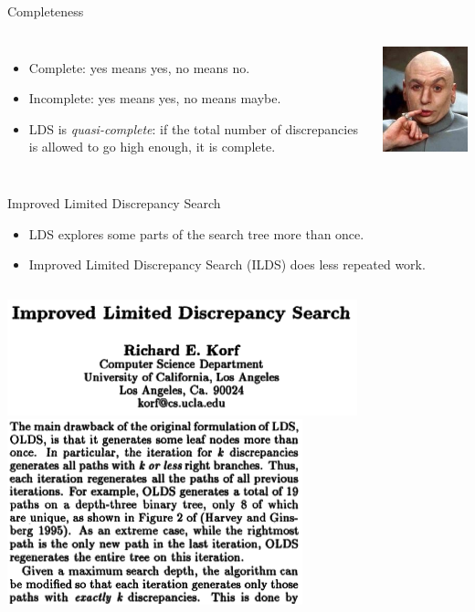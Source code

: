 \documentclass{beamer}
\begin{document}
\begin{frame}{Completeness}
    \begin{columns}
        \begin{itemize}
            \item Complete: yes means yes, no means no.
            \item Incomplete: yes means yes, no means maybe.
            \item LDS is \emph{quasi-complete}: if the total number of discrepancies is allowed to go
                high enough, it is complete.
        \end{itemize}
        \centering\includegraphics*[keepaspectratio=true,scale=0.4]{quasi.jpg}
    \end{columns}
\end{frame}

\begin{frame}{Improved Limited Discrepancy Search}
    \begin{itemize}
        \item LDS explores some parts of the search tree more than once.
        \item Improved Limited Discrepancy Search (ILDS) does less repeated work.
    \end{itemize}

    \begin{columns}[T]
        \centering\includegraphics*[keepaspectratio=true,scale=0.4]{ilds-paper.png}
        \centering\includegraphics*[keepaspectratio=true,scale=0.4]{ilds-claim.png}
    \end{columns}
\end{frame}
\end{document}
